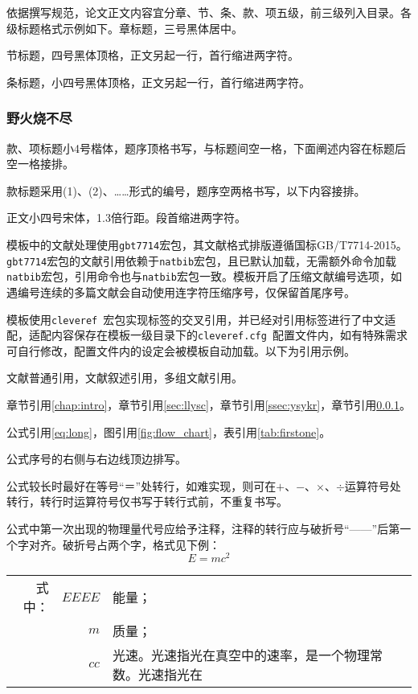 依据撰写规范，论文正文内容宜分章、节、条、款、项五级，前三级列入目录。各级标题格式示例如下。章标题，三号黑体居中。

\label{sec:llysc}
节标题，四号黑体顶格，正文另起一行，首行缩进两字符。

\label{ssec:ysykr}
条标题，小四号黑体顶格，正文另起一行，首行缩进两字符。
\subsubsection{野火烧不尽}\label{sssec:yhsbj}
款、项标题小4号楷体，题序顶格书写，与标题间空一格，下面阐述内容在标题后空一格接排。

款标题采用(1)、(2)、……形式的编号，题序空两格书写，以下内容接排。

正文小四号宋体，1.3倍行距。段首缩进两字符。

模板中的文献处理使用\verb|gbt7714|宏包，其文献格式排版遵循国标GB/T7714-2015。\verb|gbt7714|宏包的文献引用依赖于\verb|natbib|宏包，且已默认加载，无需额外命令加载\verb|natbib|宏包，引用命令也与\verb|natbib|宏包一致。模板开启了压缩文献编号选项，如遇编号连续的多篇文献会自动使用连字符压缩序号，仅保留首尾序号。

模板使用\verb|cleveref|~宏包实现标签的交叉引用，并已经对引用标签进行了中文适配，适配内容保存在模板一级目录下的\verb|cleveref.cfg|~配置文件内，如有特殊需求可自行修改，配置文件内的设定会被模板自动加载。以下为引用示例。

文献普通引用\cite{同鸣2012}，文献叙述引用\citet{Boutsidis2011}，多组文献引用\cite{同鸣2012, Lee1999, Tang2013, Ding2006Orthogonal}。

章节引用\cref{chap:intro}，章节引用\cref{sec:llysc}，章节引用\cref{ssec:ysykr}，章节引用\cref{sssec:yhsbj}。

公式引用\cref{eq:long}，图引用\cref{fig:flow_chart}，表引用\cref{tab:firstone}。

公式序号的右侧与右边线顶边排写。

公式较长时最好在等号“＝”处转行，如难实现，则可在$ + $、$ - $、$ \times $、$ \div $运算符号处转行，转行时运算符号仅书写于转行式前，不重复书写。

公式中第一次出现的物理量代号应给予注释，注释的转行应与破折号“——\nobreak”后第一个字对齐。破折号占两个字，格式见下例：
\begin{equation}\label{eq:norm}
E=mc^2
\end{equation}
\begin{flushleft}
    \begin{tabularx}{\textwidth}{@{}rr@{~——~}X@{}}
     式中：& $ EEEE $ & 能量； \\
          & $ m $    & 质量； \\
          & $ cc $   & 光速。光速指光在真空中的速率，是一个物理常数。光速指光在
    \end{tabularx}
\end{flushleft}

